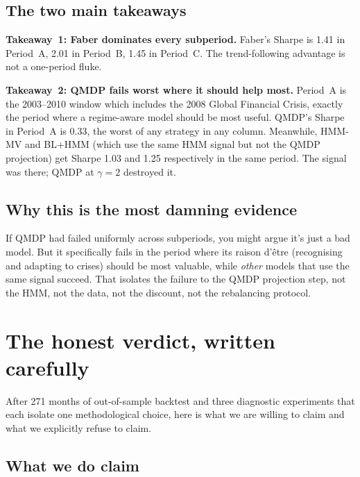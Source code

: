 \documentclass[11pt]{article}
\begin{document}
\subsection{The two main takeaways}

\textbf{Takeaway~1: Faber dominates every subperiod.} Faber's Sharpe is 1.41 in Period~A, 2.01 in Period~B, 1.45 in Period~C. The trend-following advantage is not a one-period fluke.

\textbf{Takeaway~2: QMDP fails worst where it should help most.} Period~A is the 2003--2010 window which includes the 2008 Global Financial Crisis, exactly the period where a regime-aware model should be most useful. QMDP's Sharpe in Period~A is 0.33, the worst of any strategy in any column. Meanwhile, HMM-MV and BL+HMM (which use the same HMM signal but not the QMDP projection) get Sharpe 1.03 and 1.25 respectively in the same period. The signal was there; QMDP at $\gamma = 2$ destroyed it.

\subsection{Why this is the most damning evidence}

If QMDP had failed uniformly across subperiods, you might argue it's just a bad model. But it specifically fails in the period where its raison d'être (recognising and adapting to crises) should be most valuable, while \emph{other} models that use the same signal succeed. That isolates the failure to the QMDP projection step, not the HMM, not the data, not the discount, not the rebalancing protocol.

\section{The honest verdict, written carefully}

After 271 months of out-of-sample backtest and three diagnostic experiments that each isolate one methodological choice, here is what we are willing to claim and what we explicitly refuse to claim.

\subsection{What we do claim}
\end{document}
